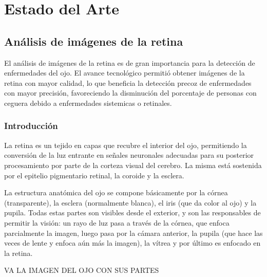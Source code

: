 
\chapter{Estado del Arte} %

\label{Chapter2} %


\section{An\'alisis de im\'agenes de la retina}

El an\'alisis de im\'agenes de la retina es de gran importancia para la detecci\'on de enfermedades del ojo.
El avance tecnol\'ogico permiti\'o obtener im\'agenes de la retina con mayor calidad, lo que beneficia la detecci\'on precoz de enfermedades con mayor precisi\'on, favoreciendo la disminuci\'on del porcentaje de personas con ceguera debido a enfermedades sistemicas o retinales. 

\subsection{Introducci\'on}

La retina es un tejido en capas que recubre el interior del ojo, permitiendo la conversión de la luz entrante en señales neuronales adecuadas para su posterior procesamiento por parte de la corteza visual del cerebro. La misma está sostenida por el epitelio pigmentario retinal, la coroide y la esclera.

La estructura anatómica del ojo se compone básicamente por la córnea (transparente), la esclera (normalmente blanca), el iris (que da color al ojo) y la pupila. Todas estas partes son visibles desde el exterior, y son las responsables de permitir la visión: un rayo de luz pasa a través de la córnea, que enfoca parcialmente la imagen, luego pasa por la cámara anterior, la pupila (que hace las veces de lente y enfoca aún más la imagen), la vítrea y por último es enfocado en la retina.

VA LA IMAGEN DEL OJO CON SUS PARTES


